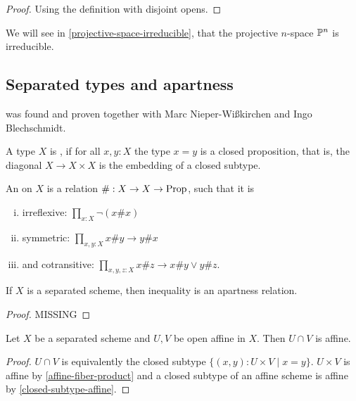 \begin{proof}
  Using the definition with disjoint opens.
\end{proof}

We will see in \cref{projective-space-irreducible}, that the projective $n$-space $\mathbb{P}^n$ is irreducible.

\subsection{Separated types and apartness}

 was found and proven together with Marc Nieper-Wißkirchen and Ingo Blechschmidt.

\begin{definition}%
  A type $X$ is , if for all $x,y:X$
  the type $x=y$ is a closed proposition,
  that is,
  the diagonal $X \to X\times X$ is the embedding of a closed subtype.
\end{definition}

\begin{definition}
  An  on $X$ is a relation $\#:X\to X\to \mathrm{Prop}$, such that it is
  \begin{enumerate}[(i)]
  \item irreflexive: $\prod_{x:X}\neg(x \# x)$
  \item symmetric: $\prod_{x,y:X} x\# y \to y\# x$
  \item and cotransitive: $\prod_{x,y,z:X} x\# z \to x\# y \vee y\# z$.
  \end{enumerate}
\end{definition}

\begin{proposition}%
  \label{separated-inequality-apartness}
  If $X$ is a separated scheme, then inequality is an apartness relation.
\end{proposition}

\begin{proof}
  MISSING
\end{proof}

\begin{proposition}%
  Let $X$ be a separated scheme and $U,V$ be open affine in $X$.
  Then $U\cap V$ is affine.
\end{proposition}

\begin{proof}
  $U\cap V$ is equivalently the closed subtype $\{(x,y) : U\times V\mid x=y\}$.
  $U\times V$ is affine by \cref{affine-fiber-product} and a closed subtype of an affine scheme is affine by \cref{closed-subtype-affine}.
\end{proof}

